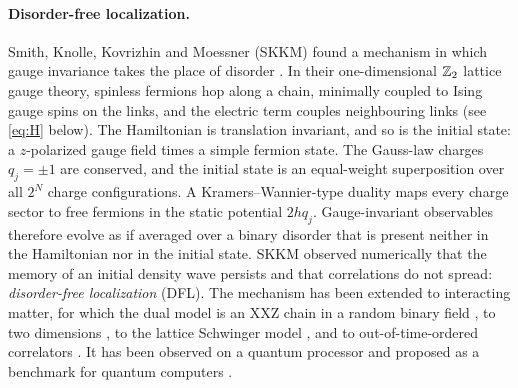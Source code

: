 \paragraph{Disorder-free localization.}
Smith, Knolle, Kovrizhin and Moessner (SKKM) found a mechanism in which gauge invariance takes the place of
disorder \cite{SKKM2017}.  In their one-dimensional $\mathbb{Z}_2$ lattice gauge theory, spinless fermions hop along
a chain, minimally coupled to Ising gauge spins on the links, and the electric term couples neighbouring links
(see \eqref{eq:H} below).  The Hamiltonian is translation invariant, and so is the initial state: a $z$-polarized
gauge field times a simple fermion state.  The Gauss-law charges $q_j=\pm1$ are conserved, and the initial
state is an equal-weight superposition over all $2^N$ charge configurations.  A Kramers--Wannier-type duality
maps every charge sector to free fermions in the static potential $2hq_j$.  Gauge-invariant observables
therefore evolve as if averaged over a binary disorder that is present neither in the Hamiltonian nor in the
initial state.  SKKM observed numerically that the memory of an initial density wave persists and that
correlations do not spread: \emph{disorder-free localization} (DFL).  The mechanism has been extended to
interacting matter, for which the dual model is an XXZ chain in a random binary field \cite{SKKM2017b}, to
two dimensions \cite{SKKM2018,Karpov2021}, to the lattice Schwinger model \cite{Brenes2018}, and to
out-of-time-ordered correlators \cite{SKKM2019}.  It has been observed on a quantum processor
\cite{Gyawali2024} and proposed as a benchmark for quantum computers \cite{Halimeh2024bench}.

